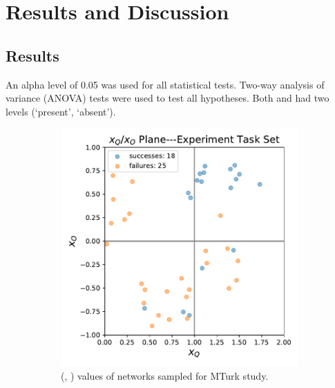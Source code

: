\section{Results and Discussion} \label{sec:results_discussion}
\subsection{Results} \label{sec:results}
An alpha level of 0.05 was used for all statistical tests. Two-way analysis of variance (ANOVA) tests were used to test all hypotheses. Both \xQ{} and \xO had two levels (`present', `absent').
\begin{figure}[tbp]
    \centering
    \begin{subfigure}[b]{0.30\linewidth}
        \centering
        \includegraphics[width=1.0\linewidth]{Figures/xQxO_plane_experiment_set.pdf}
        \vfill
        \caption{(\xQ{}, \xO{}) values of networks sampled for MTurk study.}
        \label{fig:exp_set}
    \end{subfigure}%
    \hfill
    \begin{subfigure}[b]{0.30\linewidth}
        \centering

\end{subfigure}
\end{figure}
